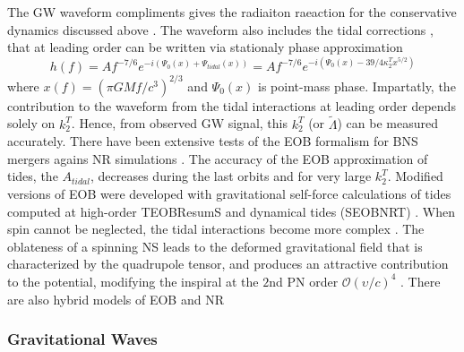 The \ac{GW} waveform compliments gives the radiaiton raeaction for the conservative 
dynamics discussed above \cite{41}. The waveform also includes the tidal corrections \cite{6,42},
that at leading order can be written via stationaly phase approximation 
%
\begin{equation}
    h(f) = Af^{-7/6}e^{-i(\Psi_0(x) + \Psi_{tidal}(x))} = Af^{-7/6}e^{-i(\Psi_0(x)-39/4\kappa_2^Tx^{5/2})}
\end{equation}
%
where $x(f) = (\pi G M f / c^3)^{2/3}$ and $\Psi_0(x)$ is point-mass phase.
%
Impartatly, the contribution to the waveform from the tidal interactions at leading order 
depends solely on $k_2^T$. 
Hence, from observed \ac{GW} signal, this $k_2^T$ (or $\tilde{\Lambda}$) can be measured 
accurately. 
%
There have been extensive tests of the \ac{EOB} formalism for \ac{BNS} mergers agains \ac{NR} 
simulations \cite{43,38,44,45,46}. 
The accuracy of the \ac{EOB} approximation of tides, the $A_{tidal}$, decreases during 
the last orbits and for very large $k_2^T$. Modified versions of \ac{EOB} were developed 
with gravitational self-force calculations of tides computed at high-order TEOBResumS 
\cite{44,47,46,48} and dynamical tides (SEOBNRT) \cite{49}.
When spin cannot be neglected, the tidal interactions become more complex \cite{50,51}.
The oblateness of a spinning \ac{NS} leads to the deformed gravitational field that is 
characterized by the quadrupole tensor, and produces an attractive contribution to the 
potential, modifying the inspiral at the $2$nd \ac{PN} order $\mathcal{O}(\upsilon/c)^4$
\cite{50}. 
There are also hybrid models of \ac{EOB} and \ac{NR} \cite{52,53}


\subsubsection{Gravitational Waves}

